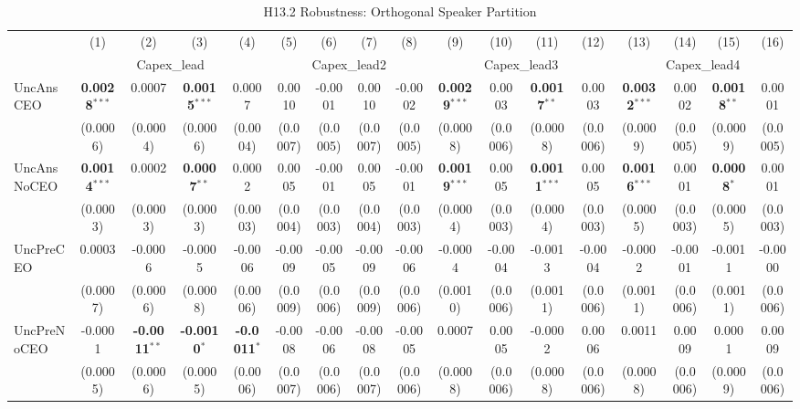 \documentclass[11pt,a4paper]{article}
\begin{document}
\clearpage
\begin{table}[htbp]
\centering
\caption{H13.2 Robustness: Orthogonal Speaker Partition}
\label{tab:h13_2_robust}
\scriptsize
\begin{tabular}{lcccccccccccccccc}
\toprule
 & (1) & (2) & (3) & (4) & (5) & (6) & (7) & (8) & (9) & (10) & (11) & (12) & (13) & (14) & (15) & (16) \\
 & \multicolumn{4}{c}{Capex\_lead} & \multicolumn{4}{c}{Capex\_lead2} & \multicolumn{4}{c}{Capex\_lead3} & \multicolumn{4}{c}{Capex\_lead4} \\
\cmidrule(lr){2-5} \cmidrule(lr){6-9} \cmidrule(lr){10-13} \cmidrule(lr){14-17}
\midrule
UncAnsCEO & \textbf{0.0028}$^{***}$ & 0.0007 & \textbf{0.0015}$^{***}$ & 0.0007 & 0.0010 & -0.0001 & 0.0010 & -0.0002 & \textbf{0.0029}$^{***}$ & 0.0003 & \textbf{0.0017}$^{**}$ & 0.0003 & \textbf{0.0032}$^{***}$ & 0.0002 & \textbf{0.0018}$^{**}$ & 0.0001 \\
 & (0.0006) & (0.0004) & (0.0006) & (0.0004) & (0.0007) & (0.0005) & (0.0007) & (0.0005) & (0.0008) & (0.0006) & (0.0008) & (0.0006) & (0.0009) & (0.0005) & (0.0009) & (0.0005) \\
UncAnsNoCEO & \textbf{0.0014}$^{***}$ & 0.0002 & \textbf{0.0007}$^{**}$ & 0.0002 & 0.0005 & -0.0001 & 0.0005 & -0.0001 & \textbf{0.0019}$^{***}$ & 0.0005 & \textbf{0.0011}$^{***}$ & 0.0005 & \textbf{0.0016}$^{***}$ & 0.0001 & \textbf{0.0008}$^{*}$ & 0.0001 \\
 & (0.0003) & (0.0003) & (0.0003) & (0.0003) & (0.0004) & (0.0003) & (0.0004) & (0.0003) & (0.0004) & (0.0003) & (0.0004) & (0.0003) & (0.0005) & (0.0003) & (0.0005) & (0.0003) \\
UncPreCEO & 0.0003 & -0.0006 & -0.0005 & -0.0006 & -0.0009 & -0.0005 & -0.0009 & -0.0006 & -0.0004 & -0.0004 & -0.0013 & -0.0004 & -0.0002 & -0.0001 & -0.0011 & -0.0000 \\
 & (0.0007) & (0.0006) & (0.0008) & (0.0006) & (0.0009) & (0.0006) & (0.0009) & (0.0006) & (0.0010) & (0.0006) & (0.0011) & (0.0006) & (0.0011) & (0.0006) & (0.0011) & (0.0006) \\
UncPreNoCEO & -0.0001 & \textbf{-0.0011}$^{**}$ & \textbf{-0.0010}$^{*}$ & \textbf{-0.0011}$^{*}$ & -0.0008 & -0.0006 & -0.0008 & -0.0005 & 0.0007 & 0.0005 & -0.0002 & 0.0006 & 0.0011 & 0.0009 & 0.0001 & 0.0009 \\
 & (0.0005) & (0.0006) & (0.0005) & (0.0006) & (0.0007) & (0.0006) & (0.0007) & (0.0006) & (0.0008) & (0.0006) & (0.0008) & (0.0006) & (0.0008) & (0.0006) & (0.0009) & (0.0006) \\

\end{tabular}
\end{table}
\end{document}

